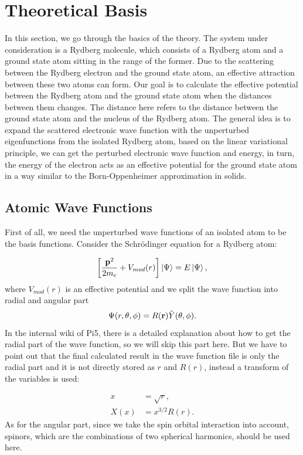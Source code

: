 \documentclass[british,english]{article}
\numberwithin{equation}{section}
\numberwithin{figure}{section}
\begin{document}
\section{Theoretical Basis}

In this section, we go through the basics of the theory. The system
under consideration is a Rydberg molecule, which consists of a Rydberg
atom and a ground state atom sitting in the range of the former. Due
to the scattering between the Rydberg electron and the ground state
atom, an effective attraction between these two atoms can form. Our
goal is to calculate the effective potential between the Rydberg atom
and the ground state atom when the distances between them changes.
The distance here refers to the distance between the ground state
atom and the nucleus of the Rydberg atom. The general idea is to expand
the scattered electronic wave function with the unperturbed eigenfunctions
from the isolated Rydberg atom, based on the linear variational principle,
we can get the perturbed electronic wave function and energy, in turn,
the energy of the electron acts as an effective potential for the
ground state atom in a way similar to the Born-Oppenheimer approximation
in solids. 

\subsection{Atomic Wave Functions}

First of all, we need the unperturbed wave functions of an isolated
atom to be the basis functions. Consider the Schr\"odinger equation
for a Rydberg atom: 

\begin{equation}
\left[\frac{{\bf p}^{2}}{2m_{e}}+V_{mod}(r)\right]\Ket{\Psi}=E\Ket{\Psi},
\end{equation}
where $V_{mod}(r)$ is an effective potential and we split the wave
function into radial and angular part
\begin{equation}
\Psi(r,\theta,\phi)=R({\bf r})\tilde{Y}(\theta,\phi).
\label{equ:wavefunc}
\end{equation}
In the internal wiki of Pi5, there is a detailed explanation about
how to get the radial part of the wave function, so we will skip this
part here. But we have to point out that the final calculated result
in the wave function file is only the radial part and it is not directly
stored as $r$ and $R(r)$, instead a transform of the variables is
used:

\begin{equation}
\begin{aligned}
x&=\sqrt{r},\\
X(x)&=x^{3/2}R(r).
\label{equ:trans}
\end{aligned}
\end{equation}As for the angular part, since we take the spin orbital interaction
into account, spinors, which are the combinations of two spherical
harmonics, should be used here.
\end{document}
